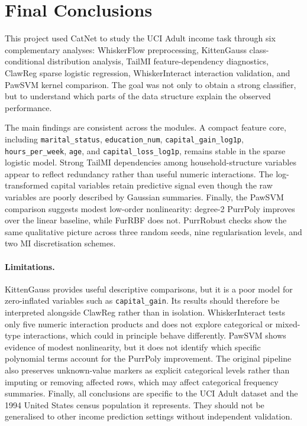 \documentclass[11pt]{article}
\begin{document}
\section{Final Conclusions}
\label{sec:conclusions}

This project used CatNet to study the UCI Adult income task through six complementary analyses: WhiskerFlow preprocessing, KittenGauss class-conditional distribution analysis, TailMI feature-dependency diagnostics, ClawReg sparse logistic regression, WhiskerInteract interaction validation, and PawSVM kernel comparison. The goal was not only to obtain a strong classifier, but to understand which parts of the data structure explain the observed performance.

The main findings are consistent across the modules. A compact feature core, including \texttt{marital\_status}, \texttt{education\_num}, \texttt{capital\_gain\_log1p}, \texttt{hours\_per\_week}, \texttt{age}, and \texttt{capital\_loss\_log1p}, remains stable in the sparse logistic model. Strong TailMI dependencies among household-structure variables appear to reflect redundancy rather than useful numeric interactions. The log-transformed capital variables retain predictive signal even though the raw variables are poorly described by Gaussian summaries. Finally, the PawSVM comparison suggests modest low-order nonlinearity: degree-2 PurrPoly improves over the linear baseline, while FurRBF does not. PurrRobust checks show the same qualitative picture across three random seeds, nine regularisation levels, and two MI discretisation schemes.

\paragraph{Limitations.}
KittenGauss provides useful descriptive comparisons, but it is a poor
model for zero-inflated variables such as \texttt{capital\_gain}.
Its results should therefore be interpreted alongside ClawReg rather
than in isolation.  WhiskerInteract tests only five numeric interaction
products and does not explore categorical or mixed-type interactions,
which could in principle behave differently.  PawSVM shows evidence of
modest nonlinearity, but it does not identify which specific polynomial
terms account for the PurrPoly improvement.  The original pipeline also
preserves unknown-value markers as explicit categorical levels rather
than imputing or removing affected rows, which may affect categorical
frequency summaries.  Finally, all conclusions are specific to the UCI
Adult dataset and the 1994 United States census population it
represents.  They should not be generalised to other income prediction
settings without independent validation.


\end{document}
